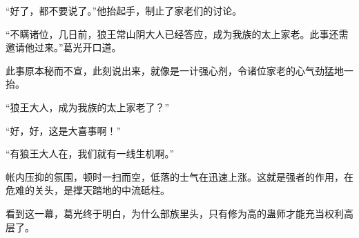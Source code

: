 \begin{this_body}
“好了，都不要说了。”他抬起手，制止了家老们的讨论。

“不瞒诸位，几日前，狼王常山阴大人已经答应，成为我族的太上家老。此事还需邀请他过来。”葛光开口道。

此事原本秘而不宣，此刻说出来，就像是一计强心剂，令诸位家老的心气劲猛地一抬。

“狼王大人，成为我族的太上家老了？”

“好，好，这是大喜事啊！”

“有狼王大人在，我们就有一线生机啊。”

帐内压抑的氛围，顿时一扫而空，低落的士气在迅速上涨。这就是强者的作用，在危难的关头，是撑天踏地的中流砥柱。

看到这一幕，葛光终于明白，为什么部族里头，只有修为高的蛊师才能充当权利高层了。

\end{this_body}

